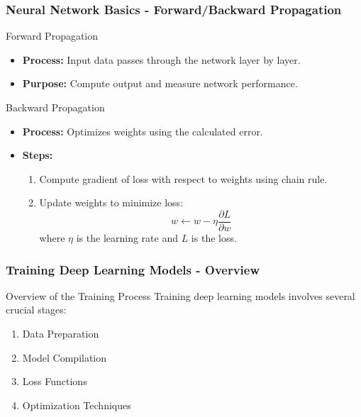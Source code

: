 \documentclass[aspectratio=169]{beamer}
\begin{document}
\begin{frame}[fragile]
    \frametitle{Neural Network Basics - Forward/Backward Propagation}
    \begin{block}{Forward Propagation}
        \begin{itemize}
            \item \textbf{Process:} Input data passes through the network layer by layer.
            \item \textbf{Purpose:} Compute output and measure network performance.
        \end{itemize}
    \end{block}
    
    \begin{block}{Backward Propagation}
        \begin{itemize}
            \item \textbf{Process:} Optimizes weights using the calculated error.
            \item \textbf{Steps:}
            \begin{enumerate}
                \item Compute gradient of loss with respect to weights using chain rule.
                \item Update weights to minimize loss:
                \begin{equation}
                    w \leftarrow w - \eta \frac{\partial L}{\partial w}
                \end{equation}
                where \( \eta \) is the learning rate and \( L \) is the loss.
            \end{enumerate}
        \end{itemize}
    \end{block}
\end{frame}

\begin{frame}[fragile]
    \frametitle{Training Deep Learning Models - Overview}
    \begin{block}{Overview of the Training Process}
        Training deep learning models involves several crucial stages:
        \begin{enumerate}
            \item Data Preparation
            \item Model Compilation
            \item Loss Functions
            \item Optimization Techniques
        \end{enumerate}
    \end{block}
\end{frame}
\end{document}

